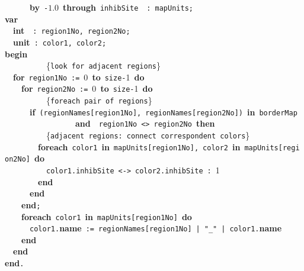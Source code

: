 ~~~~~~{\bf by}~\verb&-&$1.0$~{\bf through}~\verb&inhibSite&~~\verb&:&~\verb&mapUnits&\verb&;&\\[.15cm]
{\bf var}\\
~~{\bf int}~~\verb&:&~\verb&region1No&\verb&,&~\verb&region2No&\verb&;&\\
~~{\bf unit}~\verb&:&~\verb&color1&\verb&,&~\verb&color2&\verb&;&\\[.15cm] 
{\bf begin}\\
~~~~~~~~~~{\small \{\verb{look for adjacent regions{\}}\\
~~{\bf for}~\verb&region1No&~\verb&:=&~0~{\bf to}~\verb&size&\verb&-&1~{\bf do}\\
~~~~{\bf for}~\verb&region2No&~\verb&:=&~0~{\bf to}~\verb&size&\verb&-&1~{\bf do}\\
~~~~~~~~~~{\small \{\verb{foreach pair of regions{\}}\\
~~~~~~{\bf if}~\verb&(&\verb&regionNames&\verb&[&\verb&region1No&\verb&]&\verb&,&~\verb&regionNames&\verb&[&\verb&region2No&\verb&]&\verb&)&~{\bf in}~\verb&borderMap&~\\
~~~~~~~~~~~~~~~~~{\bf and}~~\verb&region1No&~\verb&<>&~\verb&region2No&~{\bf then}\\
~~~~~~~~~~{\small \{\verb{adjacent regions: connect correspondent colors{\}}\\
~~~~~~~~{\bf foreach}~\verb&color1&~{\bf in}~\verb&mapUnits&\verb&[&\verb&region1No&\verb&]&\verb&,&~\verb&color2&~{\bf in}~\verb&mapUnits&\verb&[&\verb&region2No&\verb&]&~{\bf do}\\
~~~~~~~~~~\verb&color1&\verb&.&\verb&inhibSite&~\verb&<->&~\verb&color2&\verb&.&\verb&inhibSite&~\verb&:&~1\\
~~~~~~~~{\bf end}\\
~~~~~~{\bf end}\\
~~~~{\bf end}\verb&;&\\
~~~~{\bf foreach}~\verb&color1&~{\bf in}~\verb&mapUnits&\verb&[&\verb&region1No&\verb&]&~{\bf do}\\
~~~~~~\verb&color1&\verb&.&{\bf name}~\verb&:=&~\verb&regionNames&\verb&[&\verb&region1No&\verb&]&~\verb&|&~\verb&"_"&~\verb&|&~\verb&color1&\verb&.&{\bf name}\\
~~~~{\bf end}\\
~~{\bf end}\\
{\bf end}\verb&.&\\
